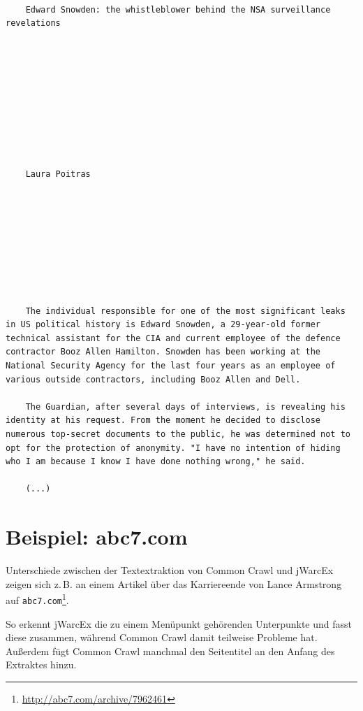 \documentclass[a4paper,12pt,titlepage=false]{scrreprt}
\begin{document}
\begin{minipage}[t]{.5\textwidth}
    \vspace{.5cm}
    \scriptsize
    \begin{lstlisting}[breaklines=true]






    Edward Snowden: the whistleblower behind the NSA surveillance revelations










    Laura Poitras









    The individual responsible for one of the most significant leaks in US political history is Edward Snowden, a 29-year-old former technical assistant for the CIA and current employee of the defence contractor Booz Allen Hamilton. Snowden has been working at the National Security Agency for the last four years as an employee of various outside contractors, including Booz Allen and Dell.

    The Guardian, after several days of interviews, is revealing his identity at his request. From the moment he decided to disclose numerous top-secret documents to the public, he was determined not to opt for the protection of anonymity. "I have no intention of hiding who I am because I know I have done nothing wrong," he said.

    (...)
    \end{lstlisting}
\end{minipage}

\section{Beispiel: abc7.com}

Unterschiede zwischen der Textextraktion von Common Crawl und jWarcEx zeigen sich z.\,B. an einem Artikel über das Karriereende von Lance Armstrong auf \texttt{abc7.com}\footnote{\url{http://abc7.com/archive/7962461}}.

So erkennt jWarcEx die zu einem Menüpunkt gehörenden Unterpunkte und fasst diese zusammen, während Common Crawl damit teilweise Probleme hat. Außerdem fügt Common Crawl manchmal den Seitentitel an den Anfang des Extraktes hinzu.
\end{document}

